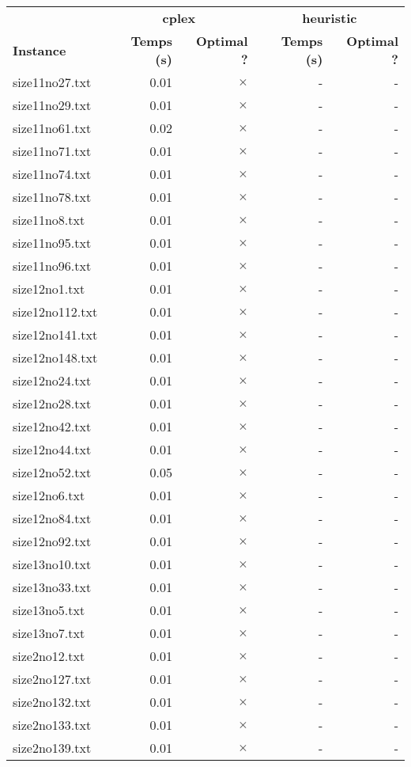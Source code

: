 \documentclass{article}
\begin{document}
\newpage
\begin{center}
\renewcommand{\arraystretch}{1.4} 
 \begin{tabular}{lrrrr}
	\hline
 & \multicolumn{2}{c}{\textbf{cplex}} & \multicolumn{2}{c}{\textbf{heuristic}}\\
\textbf{Instance}  & \textbf{Temps (s)} & \textbf{Optimal ?}  & \textbf{Temps (s)} & \textbf{Optimal ?} \\\hline

size11no27.txt & 0.01 & 
$\times$
 & - & - 
\\
size11no29.txt & 0.01 & 
$\times$
 & - & - 
\\
size11no61.txt & 0.02 & 
$\times$
 & - & - 
\\
size11no71.txt & 0.01 & 
$\times$
 & - & - 
\\
size11no74.txt & 0.01 & 
$\times$
 & - & - 
\\
size11no78.txt & 0.01 & 
$\times$
 & - & - 
\\
size11no8.txt & 0.01 & 
$\times$
 & - & - 
\\
size11no95.txt & 0.01 & 
$\times$
 & - & - 
\\
size11no96.txt & 0.01 & 
$\times$
 & - & - 
\\
size12no1.txt & 0.01 & 
$\times$
 & - & - 
\\
size12no112.txt & 0.01 & 
$\times$
 & - & - 
\\
size12no141.txt & 0.01 & 
$\times$
 & - & - 
\\
size12no148.txt & 0.01 & 
$\times$
 & - & - 
\\
size12no24.txt & 0.01 & 
$\times$
 & - & - 
\\
size12no28.txt & 0.01 & 
$\times$
 & - & - 
\\
size12no42.txt & 0.01 & 
$\times$
 & - & - 
\\
size12no44.txt & 0.01 & 
$\times$
 & - & - 
\\
size12no52.txt & 0.05 & 
$\times$
 & - & - 
\\
size12no6.txt & 0.01 & 
$\times$
 & - & - 
\\
size12no84.txt & 0.01 & 
$\times$
 & - & - 
\\
size12no92.txt & 0.01 & 
$\times$
 & - & - 
\\
size13no10.txt & 0.01 & 
$\times$
 & - & - 
\\
size13no33.txt & 0.01 & 
$\times$
 & - & - 
\\
size13no5.txt & 0.01 & 
$\times$
 & - & - 
\\
size13no7.txt & 0.01 & 
$\times$
 & - & - 
\\
size2no12.txt & 0.01 & 
$\times$
 & - & - 
\\
size2no127.txt & 0.01 & 
$\times$
 & - & - 
\\
size2no132.txt & 0.01 & 
$\times$
 & - & - 
\\
size2no133.txt & 0.01 & 
$\times$
 & - & - 
\\
size2no139.txt & 0.01 & 
$\times$
 & - & - 
\\
\hline\end{tabular}
\end{center}
\end{document}
